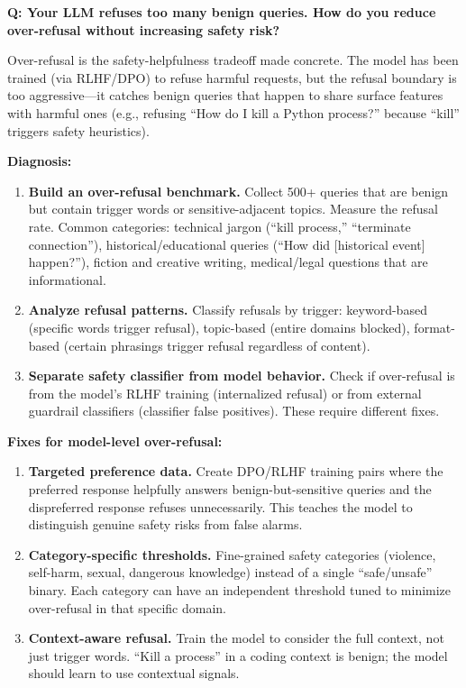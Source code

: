 
\begin{interviewq}
\textbf{Q: Your LLM refuses too many benign queries. How do you reduce over-refusal without increasing safety risk?}

 \quad {} \quad \badgefreq{\freqmed}

\stronganswer

Over-refusal is the safety-helpfulness tradeoff made concrete. The model has been trained (via RLHF/DPO) to refuse harmful requests, but the refusal boundary is too aggressive---it catches benign queries that happen to share surface features with harmful ones (e.g., refusing ``How do I kill a Python process?'' because ``kill'' triggers safety heuristics).

\textbf{Diagnosis:}
\begin{enumerate}
    \item \textbf{Build an over-refusal benchmark.} Collect 500+ queries that are benign but contain trigger words or sensitive-adjacent topics. Measure the refusal rate. Common categories: technical jargon (``kill process,'' ``terminate connection''), historical/educational queries (``How did [historical event] happen?''), fiction and creative writing, medical/legal questions that are informational.
    \item \textbf{Analyze refusal patterns.} Classify refusals by trigger: keyword-based (specific words trigger refusal), topic-based (entire domains blocked), format-based (certain phrasings trigger refusal regardless of content).
    \item \textbf{Separate safety classifier from model behavior.} Check if over-refusal is from the model's RLHF training (internalized refusal) or from external guardrail classifiers (classifier false positives). These require different fixes.
\end{enumerate}

\textbf{Fixes for model-level over-refusal:}
\begin{enumerate}
    \item \textbf{Targeted preference data.} Create DPO/RLHF training pairs where the preferred response helpfully answers benign-but-sensitive queries and the dispreferred response refuses unnecessarily. This teaches the model to distinguish genuine safety risks from false alarms.
    \item \textbf{Category-specific thresholds.} Fine-grained safety categories (violence, self-harm, sexual, dangerous knowledge) instead of a single ``safe/unsafe'' binary. Each category can have an independent threshold tuned to minimize over-refusal in that specific domain.
    \item \textbf{Context-aware refusal.} Train the model to consider the full context, not just trigger words. ``Kill a process'' in a coding context is benign; the model should learn to use contextual signals.
\end{enumerate}


\end{interviewq}
